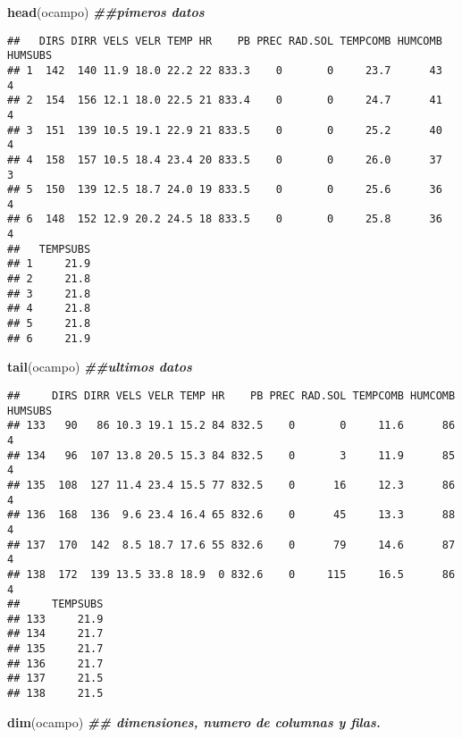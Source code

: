\documentclass[
]{article}
\newenvironment{Shaded}{\begin{snugshade}}{\end{snugshade}}
\newcommand{\DocumentationTok}[1]{\textcolor[rgb]{0.56,0.35,0.01}{\textbf{\textit{#1}}}}
\newcommand{\FunctionTok}[1]{\textcolor[rgb]{0.13,0.29,0.53}{\textbf{#1}}}
\newcommand{\NormalTok}[1]{#1}
\begin{document}
\begin{Shaded}
\begin{Highlighting}[]
\FunctionTok{head}\NormalTok{(ocampo) }\DocumentationTok{\#\#pimeros datos}
\end{Highlighting}
\end{Shaded}

\begin{verbatim}
##   DIRS DIRR VELS VELR TEMP HR    PB PREC RAD.SOL TEMPCOMB HUMCOMB HUMSUBS
## 1  142  140 11.9 18.0 22.2 22 833.3    0       0     23.7      43       4
## 2  154  156 12.1 18.0 22.5 21 833.4    0       0     24.7      41       4
## 3  151  139 10.5 19.1 22.9 21 833.5    0       0     25.2      40       4
## 4  158  157 10.5 18.4 23.4 20 833.5    0       0     26.0      37       3
## 5  150  139 12.5 18.7 24.0 19 833.5    0       0     25.6      36       4
## 6  148  152 12.9 20.2 24.5 18 833.5    0       0     25.8      36       4
##   TEMPSUBS
## 1     21.9
## 2     21.8
## 3     21.8
## 4     21.8
## 5     21.8
## 6     21.9
\end{verbatim}

\begin{Shaded}
\begin{Highlighting}[]
\FunctionTok{tail}\NormalTok{(ocampo) }\DocumentationTok{\#\#ultimos datos}
\end{Highlighting}
\end{Shaded}

\begin{verbatim}
##     DIRS DIRR VELS VELR TEMP HR    PB PREC RAD.SOL TEMPCOMB HUMCOMB HUMSUBS
## 133   90   86 10.3 19.1 15.2 84 832.5    0       0     11.6      86       4
## 134   96  107 13.8 20.5 15.3 84 832.5    0       3     11.9      85       4
## 135  108  127 11.4 23.4 15.5 77 832.5    0      16     12.3      86       4
## 136  168  136  9.6 23.4 16.4 65 832.6    0      45     13.3      88       4
## 137  170  142  8.5 18.7 17.6 55 832.6    0      79     14.6      87       4
## 138  172  139 13.5 33.8 18.9  0 832.6    0     115     16.5      86       4
##     TEMPSUBS
## 133     21.9
## 134     21.7
## 135     21.7
## 136     21.7
## 137     21.5
## 138     21.5
\end{verbatim}

\begin{Shaded}
\begin{Highlighting}[]
\FunctionTok{dim}\NormalTok{(ocampo) }\DocumentationTok{\#\# dimensiones, numero de columnas y filas.}
\end{Highlighting}
\end{Shaded}
\end{document}
